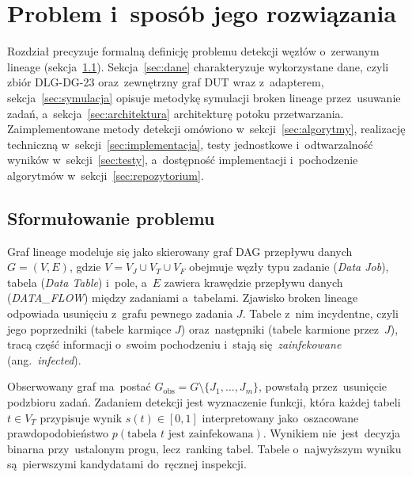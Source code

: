 
\chapter{Problem i~sposób jego rozwiązania}

Rozdział precyzuje formalną definicję problemu detekcji węzłów
o~zerwanym lineage (sekcja~\ref{sec:sformulowanie}). Sekcja~\ref{sec:dane}
charakteryzuje wykorzystane dane, czyli zbiór DLG-DG-23 oraz~zewnętrzny
graf DUT wraz z~adapterem, sekcja~\ref{sec:symulacja} opisuje
metodykę symulacji broken lineage przez~usuwanie zadań,
a~sekcja~\ref{sec:architektura} architekturę potoku przetwarzania.
Zaimplementowane metody detekcji omówiono w~sekcji~\ref{sec:algorytmy},
realizację techniczną w~sekcji~\ref{sec:implementacja}, testy jednostkowe
i~odtwarzalność wyników w~sekcji~\ref{sec:testy}, a~dostępność implementacji
i~pochodzenie algorytmów w~sekcji~\ref{sec:repozytorium}.

\section{Sformułowanie problemu}
\label{sec:sformulowanie}

Graf lineage modeluje się jako skierowany graf DAG przepływu danych
$G = (V, E)$, gdzie $V = V_{J} \cup V_{T} \cup V_{F}$ obejmuje węzły
typu zadanie (\emph{Data Job}), tabela (\emph{Data Table}) i~pole,
a~$E$ zawiera krawędzie przepływu danych (\emph{DATA\_FLOW}) między zadaniami
a~tabelami. Zjawisko broken lineage odpowiada usunięciu z~grafu pewnego
zadania $J$. Tabele z~nim incydentne, czyli jego poprzedniki (tabele
karmiące $J$) oraz~następniki (tabele karmione przez~$J$), tracą część
informacji o~swoim pochodzeniu i~stają się~\emph{zainfekowane}
(ang.~\emph{infected}).

Obserwowany graf ma~postać $G_{\mathrm{obs}} = G \setminus \{J_1,\dots,J_m\}$,
powstałą przez~usunięcie podzbioru zadań. Zadaniem detekcji jest wyznaczenie
funkcji, która każdej tabeli $t \in V_{T}$ przypisuje wynik
$s(t) \in [0, 1]$ interpretowany jako~oszacowane prawdopodobieństwo
$p(\text{tabela } t \text{ jest zainfekowana})$. Wynikiem nie~jest~decyzja
binarna przy~ustalonym progu, lecz~ranking tabel. Tabele o~najwyższym
wyniku są~pierwszymi kandydatami do~ręcznej inspekcji.


